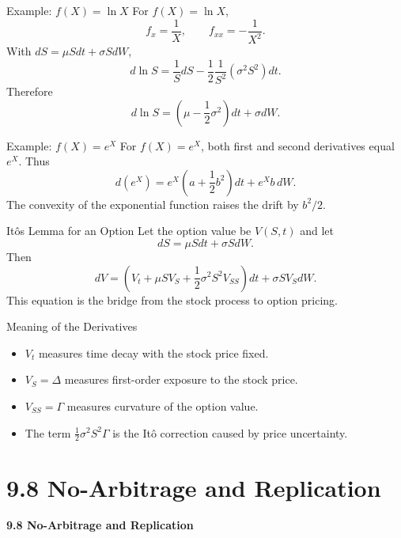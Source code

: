 \documentclass[aspectratio=169]{beamer}
\begin{document}
\begin{frame}[t]{Example: $f(X)=\ln X$}
\justifying
For $f(X)=\ln X$,
\[f_x=\frac1X,\qquad f_{xx}=-\frac1{X^2}.\]
With $dS=\mu Sdt+\sigma SdW$,
\[d\ln S=\frac1S dS-\frac12\frac1{S^2}(\sigma^2S^2)dt.\]
Therefore
\[d\ln S=\left(\mu-\frac12\sigma^2\right)dt+\sigma dW.\]
\end{frame}

\begin{frame}[t]{Example: $f(X)=e^X$}
\justifying
For $f(X)=e^X$, both first and second derivatives equal $e^X$. Thus
\[d(e^X)=e^X\left(a+\frac12b^2\right)dt+e^Xb\,dW.\]
The convexity of the exponential function raises the drift by $b^2/2$.
\end{frame}

\begin{frame}[t]{It\^o\textquotesingle s Lemma for an Option}
\justifying
Let the option value be $V(S,t)$ and let
\[dS=\mu Sdt+\sigma SdW.\]
Then
\[dV=\left(V_t+\mu SV_S+\frac12\sigma^2S^2V_{SS}\right)dt+\sigma SV_SdW.\]
This equation is the bridge from the stock process to option pricing.
\end{frame}

\begin{frame}[t]{Meaning of the Derivatives}
\justifying
\begin{itemize}
\item $V_t$ measures time decay with the stock price fixed.
\item $V_S=\Delta$ measures first-order exposure to the stock price.
\item $V_{SS}=\Gamma$ measures curvature of the option value.
\item The term $\tfrac12\sigma^2S^2\Gamma$ is the It\^o correction caused by price uncertainty.
\end{itemize}
\end{frame}

\section{9.8 No-Arbitrage and Replication}
\begin{frame}[plain]
\centering\vfill
{\color{TitleBlue}\Large\bfseries 9.8 No-Arbitrage and Replication}\par
\vspace{0.5cm}{\large Why expected stock return disappears from option value}\par
\vfill\end{frame}
\end{document}
